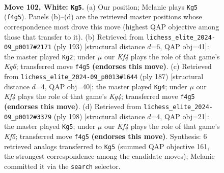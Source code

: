 \documentclass[11pt]{article}
\begin{document}
\clearpage

\begin{figure}[p]\centering
\begin{subfigure}{0.46\textwidth}\centering
\resizebox{\linewidth}{!}{%
\newchessgame
\chessboard[
  setfen={8/8/8/3k4/5K2/1N6/2R3Pr/8 w - - 68 102},
  showmover=false,
  pgfstyle=straightmove, color=movearrow, markmove={f4-g5}
]}
\caption{}
\end{subfigure}\hfill
\begin{subfigure}{0.46\textwidth}\centering
\resizebox{\linewidth}{!}{%
\newchessgame
\chessboard[
  setfen={8/8/8/7r/2K5/6k1/7p/7R b - - 3 97},
  showmover=false,
  pgfstyle=straightmove, color=movearrow, markmove={g3-g2}
]}
\caption{}
\end{subfigure}
\\[4pt]
\begin{subfigure}{0.46\textwidth}\centering
\resizebox{\linewidth}{!}{%
\newchessgame
\chessboard[
  setfen={8/8/8/6k1/3K4/7r/7p/7R b - - 2 94},
  showmover=false,
  pgfstyle=straightmove, color=movearrow, markmove={g5-g4}
]}
\caption{}
\end{subfigure}\hfill
\begin{subfigure}{0.46\textwidth}\centering
\resizebox{\linewidth}{!}{%
\newchessgame
\chessboard[
  setfen={5k2/1R5P/7r/5K2/8/8/8/8 w - - 29 100},
  showmover=false,
  pgfstyle=straightmove, color=movearrow, markmove={f5-g5}
]}
\caption{}
\end{subfigure}
\caption{\textbf{Move 102, White: \texttt{Kg5}.} (a) Our position; Melanie plays \texttt{Kg5} (\texttt{f4g5}). Panels (b)--(d) are the retrieved master positions whose correspondence most drove this move (highest QAP objective among those that transfer to it). (b) Retrieved from \texttt{lichess\_elite\_2024-09\_p0017\#2171} (ply 193) [structural distance $d$=6, QAP obj=41]: the master played \texttt{Kg2}; under $\mu$ our \emph{Kf4} plays the role of that game's \emph{Kg6}; transferred move \texttt{f4g5} \textbf{(endorses this move)}. (c) Retrieved from \texttt{lichess\_elite\_2024-09\_p0013\#1644} (ply 187) [structural distance $d$=4, QAP obj=40]: the master played \texttt{Kg4}; under $\mu$ our \emph{Kf4} plays the role of that game's \emph{Kg4}; transferred move \texttt{f4g5} \textbf{(endorses this move)}. (d) Retrieved from \texttt{lichess\_elite\_2024-09\_p0012\#3379} (ply 198) [structural distance $d$=4, QAP obj=21]: the master played \texttt{Kg5}; under $\mu$ our \emph{Kf4} plays the role of that game's \emph{Kf5}; transferred move \texttt{f4g5} \textbf{(endorses this move)}. Synthesis: 6 retrieved analogs transferred to \texttt{Kg5} (summed QAP objective 161, the strongest correspondence among the candidate moves); Melanie committed it via the \texttt{search} selector.}
\label{fig:thought-m202}
\end{figure}
\end{document}

